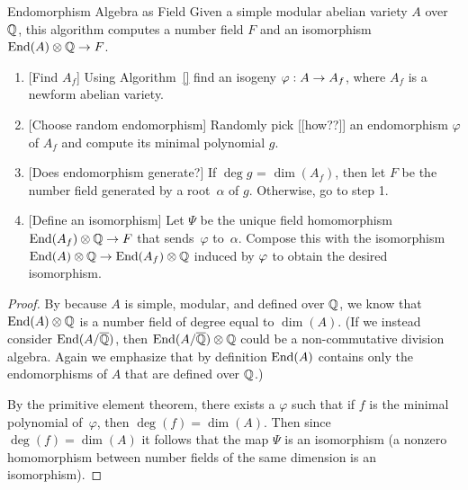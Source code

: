 \documentclass{article}
\begin{document}
\begin{algorithm}{Endomorphism Algebra as Field}
    Given a simple modular abelian variety $A$ over $\mathbb{Q}$,
    this algorithm computes a number field $F$ and an
    isomorphism $\operatorname{End}(A)\otimes\mathbb{Q} \to F$.
\begin{enumerate}

\item{} [Find $A_f$] Using Algorithm~\ref{} find an isogeny $\varphi:A\to A_f$,
where $A_f$ is a newform abelian variety.

\item{} [Choose random endomorphism] Randomly pick [[how??]] an endomorphism
  $\varphi$ of $A_f$ and compute its minimal polynomial $g$.
\item{} [Does endomorphism generate?]
If $\deg g$ = $\dim(A_f)$, then let $F$ be the
number field generated by a root~$\alpha$ of $g$.
Otherwise, go to step 1.
\item{} [Define an isomorphism] Let $\Psi$ be the unique field
  homomorphism $\operatorname{End}(A_f)\otimes\mathbb{Q} \to F$ that sends~$\varphi$
  to~$\alpha$.  Compose this with the isomorphism
$\operatorname{End}(A)\otimes\mathbb{Q} \to \operatorname{End}(A_f)\otimes\mathbb{Q}$ induced by $\varphi$
to obtain the desired isomorphism.

\end{enumerate}
\end{algorithm}
\begin{proof}

By \cite[???]{ribet:abvars} because $A$ is simple, modular, and defined over $\mathbb{Q}$,
we know that $\operatorname{End}(A)\otimes\mathbb{Q}$ is a number
field of degree equal to $\dim(A)$.  (If we instead consider $\operatorname{End}(A/\overline{\mathbb{Q}})$,
then $\operatorname{End}(A/\overline{\mathbb{Q}})\otimes\mathbb{Q}$ could be a non-commutative division algebra.
Again we emphasize that by definition $\operatorname{End}(A)$ contains only the endomorphisms
of $A$ that are defined over $\mathbb{Q}$.)

By the primitive element theorem, there exists a $\varphi$ such that
if $f$ is the minimal polynomial of~$\varphi$, then
$\deg(f) = \dim(A)$.
Then since $\deg(f) = \dim(A)$ it follows that the
map $\Psi$ is an isomorphism (a nonzero homomorphism between number
fields of the same dimension is an isomorphism).
\end{proof}
\end{document}
